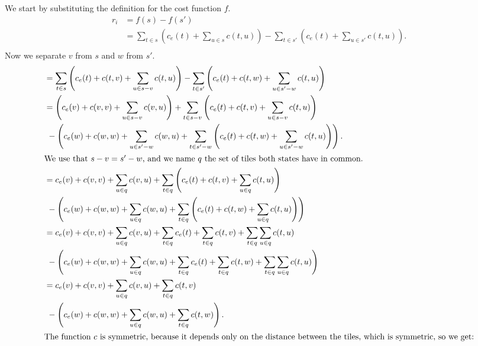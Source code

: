 We start by substituting the definition for the cost function $f$.
\begin{align*}
    r_i & = f(s) - f(s')                                                                                                                 \\
        & = \sum_{t \in s} \left(c_e(t) + \sum_{u \in s} c(t,u) \right) - \sum_{t \in s'} \left(c_e(t) + \sum_{u \in s'} c(t,u) \right). \\
\end{align*}
Now we separate $v$ from $s$ and $w$ from $s'$.
\begin{align*}
     & = \sum_{t \in s} \left(c_e(t) + c(t,v) + \sum_{u \in s - v} c(t,u)\right) - \sum_{t \in s'} \left(c_e(t) + c(t,w) + \sum_{u \in s' - w} c(t,u) \right) \\
     & = \left(c_e(v) + c(v,v) + \sum_{u \in s - v} c(v,u)\right) + \sum_{t \in s - v} \left(c_e(t) + c(t,v) + \sum_{u \in s - v} c(t,u)\right)               \\
     & \ - \left(c_e(w) + c(w,w) + \sum_{u \in s' - w} c(w,u) + \sum_{t \in s' - w} \left(c_e(t) + c(t,w) + \sum_{u \in s' - w} c(t,u) \right) \right).       \\
    \intertext{We use that $s - v = s' - w$, and we name $q$ the set of tiles both states have in common.}
     & = c_e(v) + c(v,v) + \sum_{u \in q} c(v,u) + \sum_{t \in q} \left(c_e(t) + c(t,v) + \sum_{u \in q} c(t,u)\right)                                        \\
     & \ - \left(c_e(w) + c(w,w) + \sum_{u \in q} c(w,u) + \sum_{t \in q} \left(c_e(t) + c(t,w) + \sum_{u \in q} c(t,u) \right)\right)                        \\
     & = c_e(v) + c(v,v) + \sum_{u \in q} c(v,u) + \sum_{t \in q} c_e(t) + \sum_{t \in q} c(t,v) + \sum_{t \in q} \sum_{u \in q} c(t,u)                       \\
     & \ - \left(c_e(w) + c(w,w) + \sum_{u \in q} c(w,u) + \sum_{t \in q} c_e(t) + \sum_{t \in q} c(t,w) + \sum_{t \in q} \sum_{u \in q} c(t,u)\right)        \\
     & = c_e(v) + c(v,v) + \sum_{u \in q} c(v,u) +  \sum_{t \in q} c(t,v)                                                                                     \\
     & \ - \left(c_e(w) + c(w,w) + \sum_{u \in q} c(w,u) + \sum_{t \in q} c(t,w) \right).                                                                     \\
    \intertext{The function $c$ is symmetric, because it depends only on the distance between the tiles, which is symmetric, so we get:}

\end{align*}
